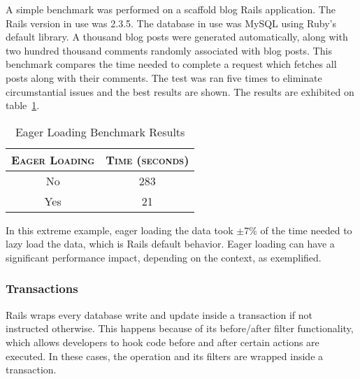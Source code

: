 A simple benchmark was performed on a scaffold blog Rails application. The Rails version in use was 2.3.5. The database in use was MySQL using Ruby's default library. A thousand blog posts were generated automatically, along with two hundred thousand comments randomly associated with blog posts. This benchmark compares the time needed to complete a request which fetches all posts along with their comments. The test was ran five times to eliminate circumstantial issues and the best results are shown. The results are exhibited on table~\ref{tab:eager_loading}.
\begin{table}[h!t]
  \centering
  \caption{Eager Loading Benchmark Results}
  \label{tab:eager_loading}
  
  \begin{tabular}{c|c}
  
    \textbf{\textsc{Eager Loading}} & \textbf{\textsc{Time (seconds)}} \\
    \hline
    No & 283 \\ \hline
    Yes & 21 \\
  \end{tabular}
\end{table}

In this extreme example, eager loading the data took $\pm$7\% of the time needed to lazy load the data, which is Rails default behavior. Eager loading can have a significant performance impact, depending on the context, as exemplified.

\subsubsection{Transactions}
Rails wraps every database write and update inside a transaction if not instructed otherwise. This happens because of its before/after filter functionality, which allows developers to hook code before and after certain actions are executed. In these cases, the operation and its filters are wrapped inside a transaction.

